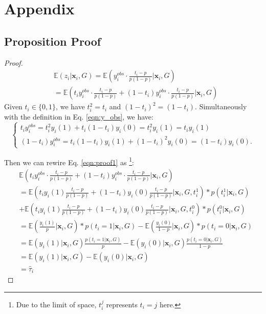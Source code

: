 \section{Appendix}
\subsection{Proposition Proof}
\label{appx:proof}

\begin{proof}
\begin{equation} 
\begin{split}
    &\mathbb{E}(z_i|\mathbf{x}_i,\mathit{G})=\mathbb{E}(y_i^{obs}\cdot \frac{t_i-p}{p(1-p)}|\mathbf{x}_i,\mathit{G})  \\ 
    &=\mathbb{E}(t_iy_i^{obs}\cdot \frac{t_i-p}{p(1-p)}+(1-t_i)y_i^{obs}\cdot \frac{t_i-p}{p(1-p)}|\mathbf{x}_i,\mathit{G})
\end{split}
\label{eqn:proof1}
\end{equation}
Given $t_i\in\{0,1\}$, we have $t_i^2=t_i$ and $(1-t_i)^2=(1-t_i)$. Simultaneously with the definition in Eq. \eqref{eqn:y_obs}, we have:
\begin{equation}
\left\{
             \begin{array}{lr}
             t_iy_i^{obs}=t_i^2y_i(1) + t_i(1 - t_i)y_i(0)=t_i^2 y_i(1)=t_iy_i(1) \nonumber \\ 
(1-t_i)y_i^{obs}=t_i(1-t_i)y_i(1) + (1 - t_i)^2y_i(0)=(1-t_i)y_i(0) . \nonumber
             \end{array}
\right.
\end{equation}

Then we can rewire Eq. \ref{eqn:proof1} as \footnote{Due to the limit of space, $t_i^j$ represents $t_i=j$ here.}: 
\begin{equation} 
\begin{split}
    &\mathbb{E}(t_iy_i^{obs}\cdot \frac{t_i-p}{p(1-p)}+(1-t_i)y_i^{obs}\cdot \frac{t_i-p}{p(1-p)}|\mathbf{x}_i,\mathit{G}) \\
    &=\mathbb{E}(t_iy_i(1)\frac{t_i-p}{p(1-p)}+(1-t_i)y_i(0) \frac{t_i-p}{p(1-p)}|\mathbf{x}_i,\mathit{G},t_i^1)*p(t_i^1|\mathbf{x}_i,\mathit{G})\\
    &+\mathbb{E}(t_iy_i(1)\frac{t_i-p}{p(1-p)}+(1-t_i)y_i(0) \frac{t_i-p}{p(1-p)}|\mathbf{x}_i,\mathit{G},t_i^0)*p(t_i^0|\mathbf{x}_i,\mathit{G}) \\
    &=\mathbb{E}(\frac{y_i(1)}{p}|\mathbf{x}_i,\mathit{G})*p(t_i=1|\mathbf{x}_i,\mathit{G})-\mathbb{E}(\frac{y_i(0)}{1-p}|\mathbf{x}_i,\mathit{G})*p(t_i=0|\mathbf{x}_i,\mathit{G})\\
    &=\mathbb{E}(y_i(1)|\mathbf{x}_i,\mathit{G})\frac{p(t_i=1|\mathbf{x}_i,\mathit{G})}{p}-\mathbb{E}(y_i(0)|\mathbf{x}_i,\mathit{G})\frac{p(t_i=0|\mathbf{x}_i,\mathit{G})}{1-p}\\
    &=\mathbb{E}(y_i(1)|\mathbf{x}_i,\mathit{G})-\mathbb{E}(y_i(0)|\mathbf{x}_i,\mathit{G}) \\
    &=\hat{\tau}_i \nonumber
\end{split}
\end{equation}
\end{proof}

